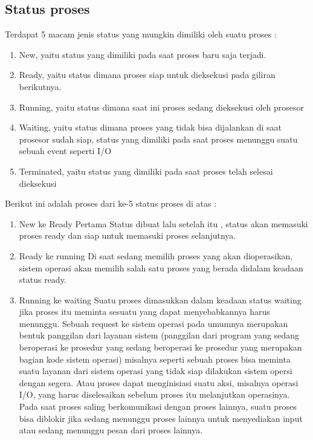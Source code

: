 	\subsection{Status proses}
	Terdapat 5 macam jenis status yang mungkin dimiliki oleh suatu proses :
	\begin{enumerate}
		\item New, yaitu status yang dimiliki pada saat proses baru saja terjadi.
		\item Ready, yaitu status dimana proses siap untuk dieksekusi pada giliran berikutnya.
		\item Running, yaitu status dimana saat ini proses sedang dieksekusi oleh prosesor
		\item Waiting, yaitu status dimana proses yang tidak bisa dijalankan di saat prosesor sudah siap, status yang dimiliki pada saat proses menunggu suatu sebuah event seperti I/O
		\item Terminated, yaitu status yang dimiliki pada saat proses telah selesai dieksekusi
	\end{enumerate}
	
	Berikut ini adalah proses dari ke-5 status proses di atas :
	\begin{enumerate}
		\item New ke Ready
		Pertama Status dibuat lalu setelah itu , status akan memasuki proses ready dan siap untuk memasuki proses selanjutnya.
		\item Ready ke running
		Di saat sedang memilih proses yang akan dioperasikan, sistem operasi akan memilih salah satu proses yang berada didalam keadaan status ready.
		\item Running ke waiting
		Suatu proses dimasukkan dalam keadaan status waiting jika proses itu meminta sesuatu yang dapat menyebabkannya harus menunggu. Sebuah request ke sistem operasi pada umumnya merupakan bentuk panggilan dari layanan sistem (panggilan dari program yang sedang beroperasi ke prosedur yang sedang beroperasi ke prosedur yang merupakan bagian kode sistem operasi) misalnya seperti sebuah proses bisa meminta suatu layanan dari sistem operasi yang tidak siap dilakukan sistem opersi dengan segera. Atau proses dapat menginisiasi suatu aksi, misalnya operasi I/O, yang harus diselesaikan sebelum proses itu melanjutkan operasinya. Pada saat proses saling berkomunikasi dengan proses lainnya, suatu proses bisa diblokir jika sedang menunggu proses lainnya untuk menyediakan input atau sedang menunggu pesan dari proses lainnya.
		
	\end{enumerate}